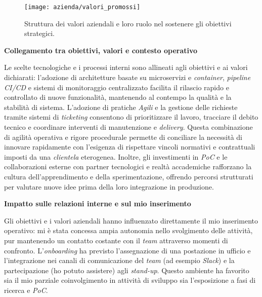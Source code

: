 \begin{figure}[htbp]
    \centering
    \texttt{[image: azienda/valori\_promossi]}
    \caption{Struttura dei valori aziendali e loro ruolo nel sostenere gli obiettivi strategici.}
    \label{fig:valori}
\end{figure}


\medskip
\noindent\textbf{Collegamento tra obiettivi, valori e contesto operativo}

Le scelte tecnologiche e i processi interni sono allineati agli obiettivi e ai valori dichiarati: l'adozione di architetture basate su microservizi e \emph{container},
\emph{pipeline} \emph{CI/CD} e sistemi di monitoraggio centralizzato facilita il rilascio rapido e controllato di nuove funzionalità, mantenendo al contempo la qualità e la stabilità di sistema.
L'adozione di pratiche \emph{Agili} e la gestione delle richieste tramite sistemi di \emph{ticketing} consentono di prioritizzare il lavoro, tracciare il debito tecnico e coordinare interventi
di manutenzione e \emph{delivery}. Questa combinazione di agilità operativa e rigore procedurale permette di conciliare la necessità di innovare rapidamente con l'esigenza di rispettare
vincoli normativi e contrattuali imposti da una \emph{clientela} eterogenea. Inoltre, gli investimenti in \emph{PoC} e le collaborazioni esterne con partner tecnologici e realtà accademiche
rafforzano la cultura dell'apprendimento e della sperimentazione, offrendo percorsi strutturati per valutare nuove idee prima della loro integrazione in produzione.

\medskip
\noindent\textbf{Impatto sulle relazioni interne e sul mio inserimento}

Gli obiettivi e i valori aziendali hanno influenzato direttamente il mio inserimento operativo: mi è stata concessa ampia autonomia nello svolgimento delle attività,
pur mantenendo un contatto costante con il \emph{team} attraverso momenti di confronto. L'\emph{onboarding} ha previsto l'assegnazione di una postazione in ufficio e
l'integrazione nei canali di comunicazione del \emph{team} (ad esempio \emph{Slack}) e la partecipazione (ho potuto assistere) agli \emph{stand-up}. 
Questo ambiente ha favorito sia il mio parziale coinvolgimento in attività di sviluppo sia l'esposizione a fasi di ricerca e \emph{PoC}.